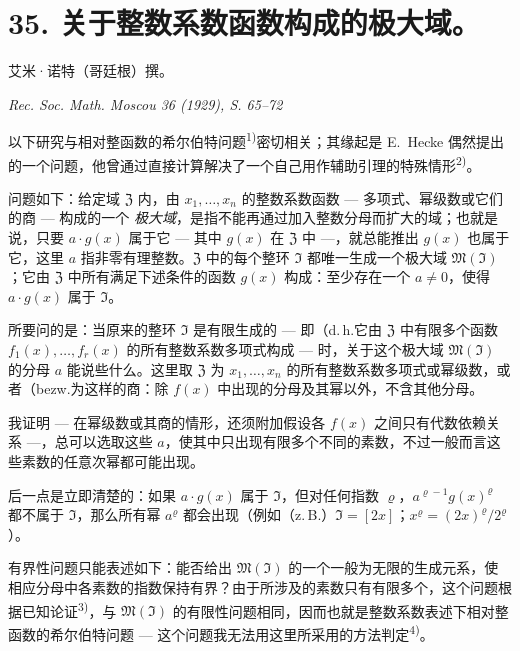 \documentclass[11pt]{article}
\begin{document}
\setcounter{footnote}{0}

\section*{35. 关于整数系数函数构成的极大域。}

\begin{center}
艾米·诺特（哥廷根）撰。\par
\emph{Rec. Soc. Math. Moscou 36 (1929), S. 65--72}
\end{center}




以下研究与相对整函数的希尔伯特问题\textsuperscript{1)}密切相关；其缘起是 E.\ Hecke 偶然提出的一个问题，他曾通过直接计算解决了一个自己用作辅助引理的特殊情形\textsuperscript{2)}。

问题如下：给定域 $\mathfrak{Z}$ 内，由 $x_1,\ldots,x_n$ 的整数系数函数 --- 多项式、幂级数或它们的商 --- 构成的一个 \textit{极大域}，是指不能再通过加入整数分母而扩大的域；也就是说，只要 $a \cdot g(x)$ 属于它 --- 其中 $g(x)$ 在 $\mathfrak{Z}$ 中 ---，就总能推出 $g(x)$ 也属于它，这里 $a$ 指非零有理整数。$\mathfrak{Z}$ 中的每个整环 $\mathfrak{I}$ 都唯一生成一个极大域 $\mathfrak{M}(\mathfrak{I})$；它由 $\mathfrak{Z}$ 中所有满足下述条件的函数 $g(x)$ 构成：至少存在一个 $a \neq 0$，使得 $a \cdot g(x)$ 属于 $\mathfrak{I}$。

所要问的是：当原来的整环 $\mathfrak{I}$ 是有限生成的 --- 即（d.\,h.\）它由 $\mathfrak{Z}$ 中有限多个函数 $f_1(x),\ldots,f_r(x)$ 的所有整数系数多项式构成 --- 时，关于这个极大域 $\mathfrak{M}(\mathfrak{I})$ 的分母 $a$ 能说些什么。这里取 $\mathfrak{Z}$ 为 $x_1,\ldots,x_n$ 的所有整数系数多项式或幂级数，或者（bezw.\）为这样的商：除 $f(x)$ 中出现的分母及其幂以外，不含其他分母。

我证明 --- 在幂级数或其商的情形，还须附加假设各 $f(x)$ 之间只有代数依赖关系 ---，总可以选取这些 $a$，使其中只出现有限多个不同的素数，不过一般而言这些素数的任意次幂都可能出现。

后一点是立即清楚的：如果 $a\cdot g(x)$ 属于 $\mathfrak{I}$，但对任何指数 $\varrho$，$a^{\varrho-1}g(x)^{\varrho}$ 都不属于 $\mathfrak{I}$，那么所有幂 $a^{\varrho}$ 都会出现（例如（z.\,B.）$\mathfrak{I}=[2x]$；$x^{\varrho}=(2x)^{\varrho}/2^{\varrho}$）。

有界性问题只能表述如下：能否给出 $\mathfrak{M}(\mathfrak{I})$ 的一个一般为无限的生成元系，使相应分母中各素数的指数保持有界？由于所涉及的素数只有有限多个，这个问题根据已知论证\textsuperscript{3)}，与 $\mathfrak{M}(\mathfrak{I})$ 的有限性问题相同，因而也就是整数系数表述下相对整函数的希尔伯特问题 --- 这个问题我无法用这里所采用的方法判定\textsuperscript{4)}。
\end{document}
